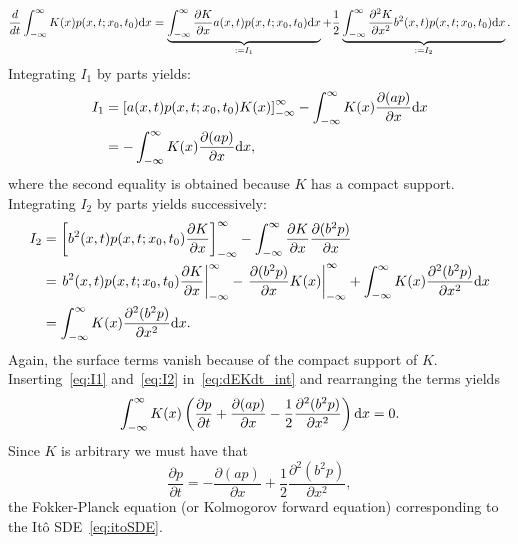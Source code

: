 \begin{equation} \label{eq:dEKdt_int}
	\frac{d}{dt} \int_{-\infty}^{\infty} K(x) p(x,t;x_0,t_0) \rm dx = \underbrace{\int_{-\infty}^{\infty} \frac{\partial K}{\partial x} a(x,t) p(x,t;x_0,t_0) \rm dx}_{:= I_1} + \frac{1}{2} \underbrace{\int_{-\infty}^{\infty} \frac{\partial^2 K}{\partial x^2} b^2(x,t) p(x,t;x_0,t_0) \rm dx}_{:= I_2}.
\end{equation}
Integrating $I_1$ by parts yields:
\begin{align}
	I_1 &= \left[ a(x,t)p(x,t;x_0,t_0)K(x)\right]_{-\infty}^{\infty} - \int_{-\infty}^{\infty} K(x) \frac{\partial{(ap)}}{\partial x} \rm dx \nonumber\\
	&= - \int_{-\infty}^{\infty} K(x) \frac{\partial{(ap)}}{\partial x} \rm dx, \label{eq:I1}
\end{align}
where the second equality is obtained because $K$ has a compact support. Integrating $I_2$ by parts yields successively:
\begin{align}
	I_2 &= 	\left[ b^2(x,t) p(x,t;x_0,t_0) \frac{\partial K}{\partial x} \right]_{-\infty}^{\infty} - \int_{-\infty}^{\infty} \frac{\partial K}{\partial x} \frac{\partial (b^2 p)}{\partial x} \nonumber\\
	&= \left. b^2(x,t) p(x,t;x_0,t_0) \frac{\partial K}{\partial x} \right|_{-\infty}^{\infty} - \left. \frac{\partial (b^2 p)}{\partial x} K(x) \right|_{-\infty}^{\infty} +  \int_{-\infty}^{\infty} K(x) \frac{\partial^2 (b^2 p)}{\partial x^2} \rm dx\nonumber\\
	&= \int_{-\infty}^{\infty} K(x) \frac{\partial^2 (b^2 p)}{\partial x^2} \rm dx. \label{eq:I2}
\end{align}
Again, the surface terms vanish because of the compact support of $K$. Inserting~\eqref{eq:I1} and~\eqref{eq:I2} in~\eqref{eq:dEKdt_int} and rearranging the terms yields
\begin{equation}
	\int_{-\infty}^{\infty} K(x) \left( \frac{\partial p}{\partial t} + \frac{\partial (ap)}{\partial x} - \frac{1}{2}\frac{\partial^2 (b^2 p)}{\partial x^2}\right) \rm dx= 0.
\end{equation}
Since $K$ is arbitrary we must have that
\begin{equation} \label{eq:FPito}
	\frac{\partial p}{\partial t} = - \frac{\partial (ap)}{\partial x} + \frac{1}{2}\frac{\partial^2 (b^2 p)}{\partial x^2},
\end{equation}
the Fokker-Planck equation (or Kolmogorov forward equation) corresponding to the Itô SDE~\eqref{eq:itoSDE}.

